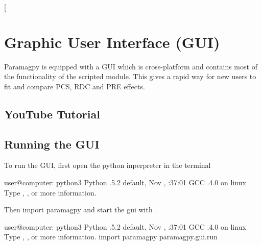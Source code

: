 \documentclass[a4paper,10pt,english,openany,oneside]{sphinxmanual}
\begin{document}
 {[}\sphinxcode{\sphinxupquote{ccr\_calculate.png}}{]}

\noindent{}


\section{Graphic User Interface (GUI)}
\label{\detokenize{paramagpy_gui:graphic-user-interface-gui}}\label{\detokenize{paramagpy_gui:paramagpy-gui}}\label{\detokenize{paramagpy_gui::doc}}
Paramagpy is equipped with a GUI which is cross-platform and contains most of the functionality of the scripted module. This gives a rapid way for new users to fit and compare PCS, RDC and PRE effects.


\subsection{YouTube Tutorial}
\label{\detokenize{paramagpy_gui:youtube-tutorial}}




\subsection{Running the GUI}
\label{\detokenize{paramagpy_gui:running-the-gui}}
To run the GUI, first open the python inperpreter in the terminal

%
\begin{sphinxVerbatim}[commandchars=\\\{\}]
user@computer:\PYGZti{}\PYGZdl{} python3
Python .5.2 default, Nov  , :37:01
\PYG{o}{[}GCC .4.0 \PYG{o}{]} on linux
Type , ,  or   more information.
\PYGZgt{}\PYGZgt{}\PYGZgt{}
\end{sphinxVerbatim}

Then import paramagpy and start the gui with .

%
\begin{sphinxVerbatim}[commandchars=\\\{\}]
user@computer:\PYGZti{}\PYGZdl{} python3
Python .5.2 default, Nov  , :37:01
\PYG{o}{[}GCC .4.0 \PYG{o}{]} on linux
Type , ,  or   more information.
\PYGZgt{}\PYGZgt{}\PYGZgt{} import paramagpy
\PYGZgt{}\PYGZgt{}\PYGZgt{} paramagpy.gui.run
\end{sphinxVerbatim}
\end{document}
